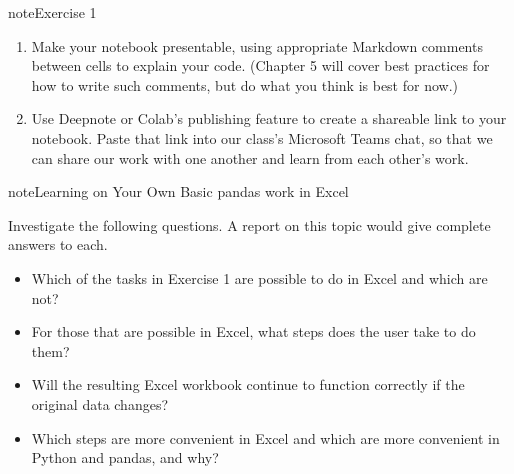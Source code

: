 \documentclass[letterpaper,10pt,english]{jupyterBook}
\begin{document}
\begin{sphinxadmonition}{note}{Exercise 1}
\begin{enumerate}
\begin{itemize}
\item {} 
\sphinxAtStartPar
Repeat the previous bullet point, but for Asian applicants, stored in a variable named .

\item {} 
\sphinxAtStartPar
Repeat the previous bullet point, but for applicants whose age is 75 or over, stored in a variable .

\end{itemize}

\item {} 
\sphinxAtStartPar
Make your notebook presentable, using appropriate Markdown comments between cells to explain your code.  (Chapter 5 will cover best practices for how to write such comments, but do what you think is best for now.)

\item {} 
\sphinxAtStartPar
Use Deepnote or Colab’s publishing feature to create a shareable link to your notebook.  Paste that link into our class’s Microsoft Teams chat, so that we can share our work with one another and learn from each other’s work.

\end{enumerate}
\end{sphinxadmonition}

\begin{sphinxadmonition}{note}{Learning on Your Own \sphinxhyphen{} Basic pandas work in Excel}

\sphinxAtStartPar
Investigate the following questions.  A report on this topic would give complete answers to each.
\begin{itemize}
\item {} 
\sphinxAtStartPar
Which of the tasks in Exercise 1 are possible to do in Excel and which are not?

\item {} 
\sphinxAtStartPar
For those that are possible in Excel, what steps does the user take to do them?

\item {} 
\sphinxAtStartPar
Will the resulting Excel workbook continue to function correctly if the original data changes?

\item {} 
\sphinxAtStartPar
Which steps are more convenient in Excel and which are more convenient in Python and pandas, and why?

\end{itemize}
\end{sphinxadmonition}
\end{document}
